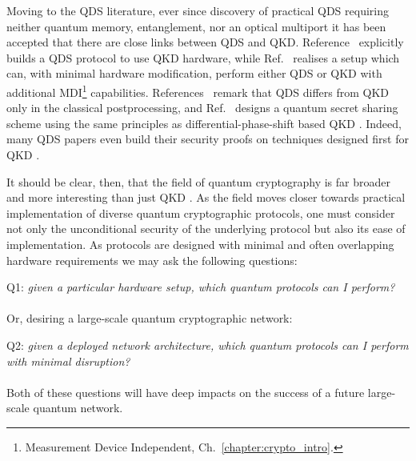 Moving to the QDS literature, ever since discovery of practical QDS requiring neither quantum memory, entanglement, nor an optical multiport it has been accepted that there are close links between QDS and QKD. Reference~\cite{Wallden2015} explicitly builds a QDS protocol to use QKD hardware, while Ref.~\cite{Roberts2017} realises a setup which can, with minimal hardware modification, perform either QDS or QKD with additional MDI\footnote{Measurement Device Independent, Ch.~\ref{chapter:crypto_intro}.} capabilities. References~\cite{Collins2016, Yin2017, Yin2017c, An2019, Roberts2017} remark that QDS differs from QKD only in the classical postprocessing, and Ref.~\cite{Wei2018} designs a quantum secret sharing scheme using the same principles as differential-phase-shift based QKD \cite{Sasaki2014}. Indeed, many QDS papers even build their security proofs on techniques designed first for QKD \cite{Kogias2017, Grice2019, Wei2018, Grice2015, Armstrong2015}.


It should be clear, then, that the field of quantum cryptography is far broader and more interesting than just QKD \cite{Broadbent2015}. As the field moves closer towards practical implementation of diverse quantum cryptographic protocols, one must consider not only the unconditional security of the underlying protocol but also its ease of implementation. As protocols are designed with minimal and often overlapping hardware requirements we may ask the following questions:
\\
\par
Q1:\emph{ given a particular hardware setup, which quantum protocols can I perform?}
\\
\\
\noindent Or, desiring a large-scale quantum cryptographic network:
\\
\par
Q2:\emph{ given a deployed network architecture, which quantum protocols can I perform with minimal disruption?}
\\
\\
\noindent Both of these questions will have deep impacts on the success of a future large-scale quantum network. %

